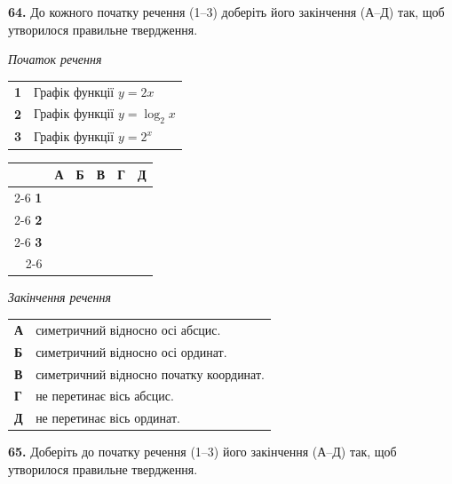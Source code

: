 \documentclass[14pt]{extarticle}
\newcommand{\answerGrid}{
    \begingroup
    \renewcommand{\arraystretch}{1.3} 
    \setlength{\tabcolsep}{7pt} 
    \begin{tabular}{r|c|c|c|c|c|}
         \multicolumn{1}{c}{} & \multicolumn{1}{c}{\textbf{А}} & \multicolumn{1}{c}{\textbf{Б}} & \multicolumn{1}{c}{\textbf{В}} & \multicolumn{1}{c}{\textbf{Г}} & \multicolumn{1}{c}{\textbf{Д}} \\ \cline{2-6}
         \textbf{1} & & & & & \\ \cline{2-6}
         \textbf{2} & & & & & \\ \cline{2-6}
         \textbf{3} & & & & & \\ \cline{2-6}
    \end{tabular}
    \endgroup
}
\begin{document}
\noindent\textbf{64.} До кожного початку речення (1--3) доберіть його закінчення (А--Д) так, щоб утворилося правильне твердження.

\vspace{0.3cm}

\noindent
\begin{minipage}[t]{0.45\textwidth}
    \textit{Початок речення} \par \vspace{0.2cm}
    \begin{tabular}{@{}p{0.5cm} l@{}}
    \textbf{1} & Графік функції $y=2x$ \\[0.4cm]
    \textbf{2} & Графік функції $y=\log_2 x$ \\[0.4cm]
    \textbf{3} & Графік функції $y=2^x$ \\
    \end{tabular}

    \vspace{1.0cm}
    \answerGrid
\end{minipage}%
\hfill
\begin{minipage}[t]{0.50\textwidth}
    \textit{Закінчення речення} \par \vspace{0.2cm}
    \begin{tabular}{@{}p{0.5cm} p{7cm}@{}}
    \textbf{А} & симетричний відносно осі абсцис. \\[0.2cm]
    \textbf{Б} & симетричний відносно осі ординат. \\[0.2cm]
    \textbf{В} & симетричний відносно початку координат. \\[0.2cm]
    \textbf{Г} & не перетинає вісь абсцис. \\[0.2cm]
    \textbf{Д} & не перетинає вісь ординат. \\
    \end{tabular}
\end{minipage}

\vspace{0.7cm}

\noindent\textbf{65.} Доберіть до початку речення (1--3) його закінчення (А--Д) так, щоб утворилося правильне твердження.

\vspace{0.3cm}
\end{document}
